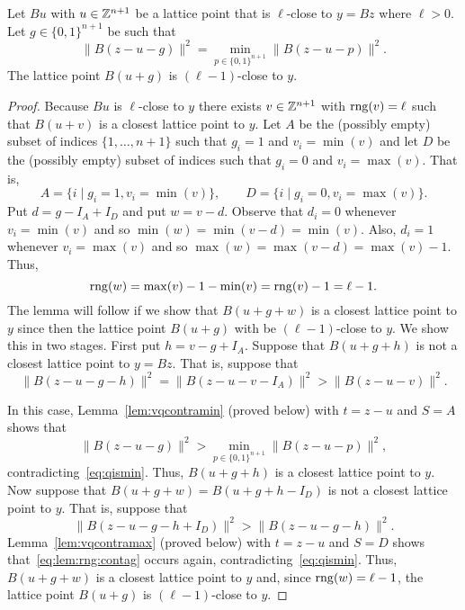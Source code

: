 \documentclass[final,leqno]{siamltex}
\begin{document}
\begin{lemma}\label{lem:rngdecreases}
Let $Bu$ with $u \in {\mathbb Z}^{n+1}$ be a lattice point that is $\ell$-close to $y = Bz$ where $\ell > 0$.  Let $g \in \{0,1\}^{n+1}$ be such that
\begin{equation}\label{eq:qismin}
\|B(z - u - g)\|^2 = \min_{p \in \{0,1\}^{n+1}}\|B(z - u - p)\|^2.
\end{equation}
The lattice point $B(u+g)$ is $(\ell-1)$-close to $y$.
\end{lemma}
\begin{proof}
Because $Bu$ is $\ell$-close to $y$ there exists $v \in {\mathbb Z}^{n+1}$ with $\operatorname{rng}(v) = \ell$ such that $B(u+v)$ is a closest lattice point to $y$.  Let $A$ be the (possibly empty) subset of indices $\{1,\dots,n+1\}$ such that $g_i = 1$ and $v_i = \min(v)$ and let $D$ be the (possibly empty) subset of indices such that $g_i = 0$ and $v_i = \max(v)$. That is,
\[
A = \{i \mid g_i = 1, v_i = \min(v) \}, \qquad D = \{i \mid g_i = 0, v_i = \max(v) \}.
\]
Put $d = g - I_A + I_D$ and put $w = v - d$.  Observe that $d_i = 0$ whenever $v_i = \min(v)$ and so $\min(w) = \min(v-d) = \min(v)$.  Also, $d_i = 1$ whenever $v_i = \max(v)$ and so $\max(w) = \max(v-d) = \max(v) - 1$.  Thus,
\[
\operatorname{rng}(w) = \max(v) - 1 - \min(v) = \operatorname{rng}(v) - 1 = \ell - 1.
\]
The lemma will follow if we show that $B(u+g+w)$ is a closest lattice point to $y$ since then the lattice point $B(u+g)$ with be $(\ell-1)$-close to $y$.  We show this in two stages.  First put $h = v - g + I_A$.  Suppose that $B(u+g+h)$ is not a closest lattice point to $y = Bz$.  That is, suppose that 
\[
\|B(z-u-g-h)\|^2 = \|B(z-u-v-I_A)\|^2 > \|B(z-u-v)\|^2.
\]

In this case, Lemma~\ref{lem:vqcontramin} (proved below) with $t = z-u$ and $S = A$ shows that 
\begin{equation}\label{eq:lem:rng:contag}
\|B(z- u - g)\|^2 > \min_{p \in \{0,1\}^{n+1}}\|B(z- u - p)\|^2,
\end{equation}
contradicting~\eqref{eq:qismin}.  Thus, $B(u+g+h)$ is a closest lattice point to $y$.  Now suppose that $B(u+g+w) = B(u+g+h-I_D)$ is not a closest lattice point to $y$.  That is, suppose that
\[
\|B(z-u-g-h+I_D)\|^2 > \|B(z-u-g-h)\|^2.
\]
Lemma~\ref{lem:vqcontramax} (proved below) with $t = z-u$ and $S = D$ shows that~\eqref{eq:lem:rng:contag} occurs again, contradicting~\eqref{eq:qismin}.  Thus, $B(u+g+w)$ is a closest lattice point to $y$ and, since $\operatorname{rng}(w) = \ell-1$, the lattice point $B(u+g)$ is $(\ell-1)$-close to $y$.
 \end{proof}
\end{document}
